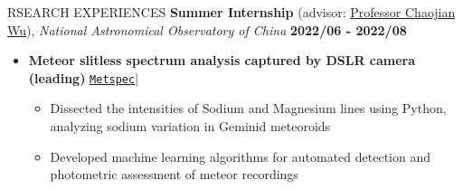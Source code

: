 \documentclass[10pt]{article} %
\begin{document}
\begin{section}{RSEARCH EXPERIENCES}
\textbf{Summer Internship} (advisor: \href{mailto:chjwu@bao.ac.cn}{Professor Chaojian Wu}), \textit{National Astronomical Observatory of China} \hfill \textbf{2022/06 - 2022/08} 
\begin{itemize}[leftmargin=1.5em]
    \item \textbf{Meteor slitless spectrum analysis captured by DSLR camera (leading)} 
    \hfill {\footnotesize \href{https://github.com/Chisen-Lupus/metspec}{\texttt{Metspec}}}| %
    \begin{itemize}[leftmargin=1.5em]
        \item Dissected the intensities of Sodium and Magnesium lines using Python, analyzing sodium variation in Geminid meteoroids
        \item Developed machine learning algorithms for automated detection and photometric assessment of meteor recordings
    \end{itemize}
\end{itemize}


\end{section}
\end{document}
